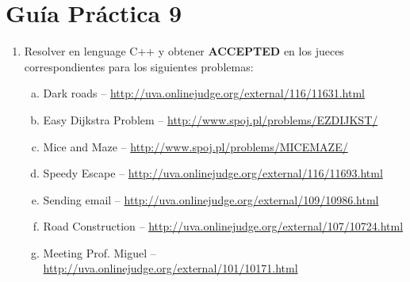 




\section*{Gu\'ia Pr\'actica 9}

\begin{enumerate}[1 -]
	
	\item Resolver en lenguage C++ y obtener \textbf{ACCEPTED} en los jueces correspondientes para los siguientes problemas:
	
	\begin{enumerate}[a)]

		\item Dark roads -- \href{http://uva.onlinejudge.org/external/116/11631.html}{http://uva.onlinejudge.org/external/116/11631.html}
		\item Easy Dijkstra Problem -- \href{http://www.spoj.pl/problems/EZDIJKST/}{http://www.spoj.pl/problems/EZDIJKST/}
		\item Mice and Maze -- \href{http://www.spoj.pl/problems/MICEMAZE/}{http://www.spoj.pl/problems/MICEMAZE/}
		\item Speedy Escape -- \href{http://uva.onlinejudge.org/external/116/11693.html}{http://uva.onlinejudge.org/external/116/11693.html}
		\item Sending email -- \href{http://uva.onlinejudge.org/external/109/10986.html}{http://uva.onlinejudge.org/external/109/10986.html}
		\item Road Construction -- \href{http://uva.onlinejudge.org/external/107/10724.html}{http://uva.onlinejudge.org/external/107/10724.html}
		\item Meeting Prof. Miguel -- \href{http://uva.onlinejudge.org/external/101/10171.html}{http://uva.onlinejudge.org/external/101/10171.html}
	\end{enumerate}
\end{enumerate}

